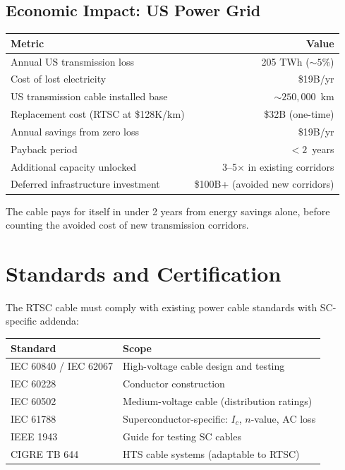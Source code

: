 \documentclass[11pt, a4paper]{article}
\begin{document}
\subsection{Economic Impact: US Power Grid}

\begin{center}
\begin{tabular}{@{}lr@{}}
\toprule
\textbf{Metric} & \textbf{Value} \\
\midrule
Annual US transmission loss & 205 TWh ($\sim 5\%$) \\
Cost of lost electricity & \$19B/yr \\
US transmission cable installed base & $\sim 250{,}000$~km \\
Replacement cost (RTSC at \$128K/km) & \$32B (one-time) \\
Annual savings from zero loss & \$19B/yr \\
Payback period & $< 2$~years \\
Additional capacity unlocked & 3--5$\times$ in existing corridors \\
Deferred infrastructure investment & \$100B+ (avoided new corridors) \\
\bottomrule
\end{tabular}
\end{center}

The cable pays for itself in under 2 years from energy savings alone,
before counting the avoided cost of new transmission corridors.

\section{Standards and Certification}
\label{sec:standards}

The RTSC cable must comply with existing power cable standards with
SC-specific addenda:

\begin{center}
\begin{tabular}{@{}ll@{}}
\toprule
\textbf{Standard} & \textbf{Scope} \\
\midrule
IEC 60840 / IEC 62067 & High-voltage cable design and testing \\
IEC 60228 & Conductor construction \\
IEC 60502 & Medium-voltage cable (distribution ratings) \\
IEC 61788 & Superconductor-specific: $I_c$, $n$-value, AC loss \\
IEEE 1943 & Guide for testing SC cables \\
CIGRE TB 644 & HTS cable systems (adaptable to RTSC) \\
\bottomrule
\end{tabular}
\end{center}
\end{document}
